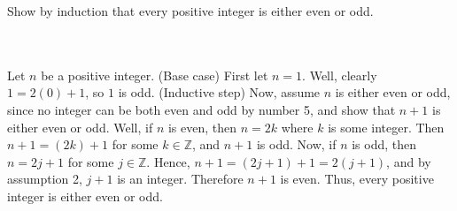 Show by induction that every positive integer is either even or odd.\\\\

\begin{solution}\renewcommand{\qedsymbol}{}\ \\
    Let $n$ be a positive integer. (Base case) First let $n=1$. Well, clearly $1=2(0)+1$, so $1$ is odd.
    (Inductive step) Now, assume $n$ is either even or odd, since no integer can be both even and odd by
    number 5, and show that $n+1$ is either even or odd. Well, if $n$ is even, then $n=2k$ where $k$ is
    some integer. Then $n+1=(2k)+1$ for some $k\in \mathbb{Z}$, and $n+1$ is odd. Now, if $n$ is odd,
    then $n=2j+1$ for some $j\in \mathbb{Z}$. Hence, $n+1=(2j+1)+1=2(j+1)$, and by assumption 2, $j+1$
    is an integer. Therefore $n+1$ is even. Thus, every positive integer is either even or odd.

\end{solution}